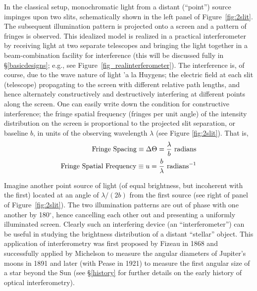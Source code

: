 \documentclass[12pt]{article}
\def\text{\rm}
\def\arcdegg{\hbox{$^\circ$}}
\begin{document}
In the classical setup, monochromatic light from a distant (``point'')
source impinges upon two slits, schematically shown in the left panel
of Figure~\ref{fig:2slit}.  The subsequent illumination pattern is
projected onto a screen and a pattern of fringes is observed.  This
idealized model is realized in a practical interferometer by receiving
light at two separate telescopes and bringing the light together in a
beam-combination facility for interference (this will be discussed
fully in \S\ref{basicdesigns}; e.g., see
Figure~\ref{fig_realinterferometer}).  The interference is, of course,
due to the wave nature of light \a'a la Huygens; the electric field at
each slit (telescope) propagating to the screen with different
relative path lengths, and hence alternately constructively and
destructively interfering at different points along the screen.  One
can easily write down the condition for constructive interference; the
fringe spatial frequency (fringes per unit angle) of the intensity
distribution on the screen is proportional to the projected slit
separation, or baseline $b$, in units of the observing wavelength
$\lambda$ (see Figure \ref{fig:2slit}).  That is,
\begin{eqnarray}
 {\text{Fringe~Spacing}}  \equiv  \Delta\Theta  =  \frac{\lambda}{b} 
{\text{~radians}} \\
 {\text{Fringe~Spatial~Frequency}}  \equiv  u  =  \frac{b}{\lambda} {\text{~radians}^{-1}}
\end{eqnarray}

Imagine another point source of light (of equal brightness, but
incoherent with the first) located at an angle of $\lambda/(2b)$ from
the first source (see right of panel of Figure~\ref{fig:2slit}).  The
two illumination patterns are out of phase with one another by
180\arcdegg, hence cancelling each other out and presenting a
uniformly illuminated screen.  Clearly such an interfering
device (an ``interferometer'') can be useful in studying the
brightness distribution of a distant ``stellar'' object.  This
application of interferometry was first proposed by Fizeau in 1868
\citep{fizeau68} and successfully applied by Michelson to measure the
angular diameters of Jupiter's moons \citep{michelson90,michelson91}
in 1891 and later (with Pease in 1921) to measure the first angular
size of a star beyond the Sun \citep{michelson21} (see \S\ref{history}
for further details on the early history of optical interferometry).
\end{document}
